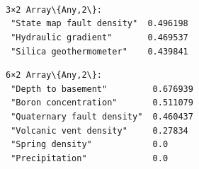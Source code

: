 \documentclass[11pt]{article}
\begin{document}
    \begin{Verbatim}[commandchars=\\\{\}]

    \end{Verbatim}

    \begin{center}
    \end{center}
    { \hspace*{\fill} \\}
    
    \begin{center}
    \end{center}
    { \hspace*{\fill} \\}
    
    \begin{Verbatim}[commandchars=\\\{\}]

    \end{Verbatim}

    \begin{center}
    \end{center}
    { \hspace*{\fill} \\}
    
    \begin{Verbatim}[commandchars=\\\{\}]

    \end{Verbatim}

    
    \begin{Verbatim}[commandchars=\\\{\}]
3×2 Array\{Any,2\}:
 "State map fault density"  0.496198
 "Hydraulic gradient"       0.469537
 "Silica geothermometer"    0.439841
    \end{Verbatim}

    
    
    \begin{Verbatim}[commandchars=\\\{\}]
6×2 Array\{Any,2\}:
 "Depth to basement"         0.676939
 "Boron concentration"       0.511079
 "Quaternary fault density"  0.460437
 "Volcanic vent density"     0.27834
 "Spring density"            0.0
 "Precipitation"             0.0
    \end{Verbatim}
\end{document}
